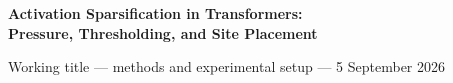 \documentclass[10pt]{article}
\begin{document}
\begin{center}
{\large\bfseries Activation Sparsification in Transformers:\\
Pressure, Thresholding, and Site Placement}\par
\small Working title --- methods and experimental setup --- 5 September 2026
\end{center}




\clearpage
\begingroup
\small
\raggedright


\endgroup
\clearpage
\appendix


\end{document}
